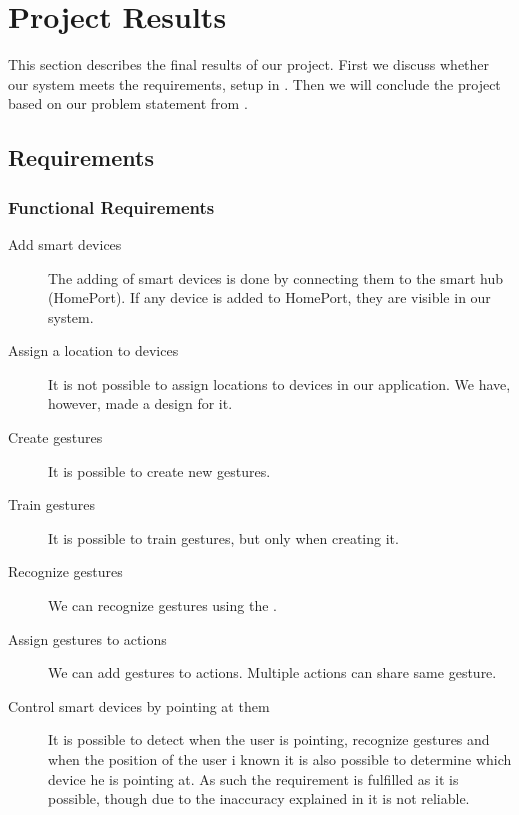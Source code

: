 \section{Project Results}\label{sec:results}
This section describes the final results of our project. 
First we discuss whether our system meets the requirements, 
setup in . 
Then we will conclude the project based on our problem statement from .

\subsection{Requirements}\label{sec:conclusion-requirements}
\subsubsection{Functional Requirements}
\begin{description}
  \item[\yes Add smart devices] The adding of smart devices is done by connecting them to the smart hub (HomePort). If any device is added to HomePort, they are visible in our system. 
  \item[\no Assign a location to devices] It is not possible to assign locations to devices in our application. We have, however, made a design for it. 
  \item[\yes Create gestures] It is possible to create new gestures.
  \item[\yes Train gestures] It is possible to train gestures, but only when creating it. 
  \item[\yes Recognize gestures] We can recognize gestures using the \threedollar.
  \item[\yes Assign gestures to actions] We can add gestures to actions. Multiple actions can share same gesture.  
  \item[\yes Control smart devices by pointing at them] It is possible to detect when the user is pointing, recognize gestures and when the position of the user i known it is also possible to determine which device he is pointing at. As such the requirement is fulfilled as it is possible, though due to the inaccuracy explained in  it is not reliable. 
\end{description}

